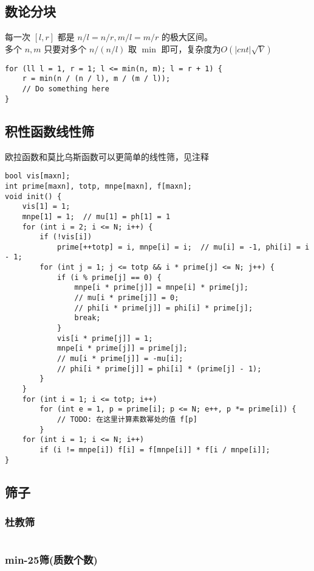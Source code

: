 \documentclass[twoside]{article}
\begin{document}
\subsection{数论分块}
\noindent 每一次 $[l,r]$ 都是 $n/l = n/r , m/l = m/r$ 的极大区间。\\
多个 $n, m$ 只要对多个 $n/(n/l)$ 取 $\min$ 即可，复杂度为$O(|cnt|\sqrt V)$
\begin{lstlisting}
for (ll l = 1, r = 1; l <= min(n, m); l = r + 1) {
	r = min(n / (n / l), m / (m / l));
	// Do something here
}\end{lstlisting}
\subsection{积性函数线性筛}
欧拉函数和莫比乌斯函数可以更简单的线性筛，见注释
\begin{lstlisting}
bool vis[maxn];
int prime[maxn], totp, mnpe[maxn], f[maxn];
void init() {
	vis[1] = 1;
	mnpe[1] = 1;  // mu[1] = ph[1] = 1
	for (int i = 2; i <= N; i++) {
		if (!vis[i])
			prime[++totp] = i, mnpe[i] = i;  // mu[i] = -1, phi[i] = i - 1;
		for (int j = 1; j <= totp && i * prime[j] <= N; j++) {
			if (i % prime[j] == 0) {
				mnpe[i * prime[j]] = mnpe[i] * prime[j];
				// mu[i * prime[j]] = 0;
				// phi[i * prime[j]] = phi[i] * prime[j];
				break;
			}
			vis[i * prime[j]] = 1;
			mnpe[i * prime[j]] = prime[j];
			// mu[i * prime[j]] = -mu[i];
			// phi[i * prime[j]] = phi[i] * (prime[j] - 1);
		}
	}
	for (int i = 1; i <= totp; i++)
		for (int e = 1, p = prime[i]; p <= N; e++, p *= prime[i]) {
			// TODO: 在这里计算素数幂处的值 f[p]
		}
	for (int i = 1; i <= N; i++)
		if (i != mnpe[i]) f[i] = f[mnpe[i]] * f[i / mnpe[i]];
}\end{lstlisting}
\subsection{筛子}
\subsubsection{杜教筛}
\begin{lstlisting}

\end{lstlisting}
\subsubsection{min-25筛(质数个数)}
\begin{lstlisting}

\end{lstlisting}
\end{document}
